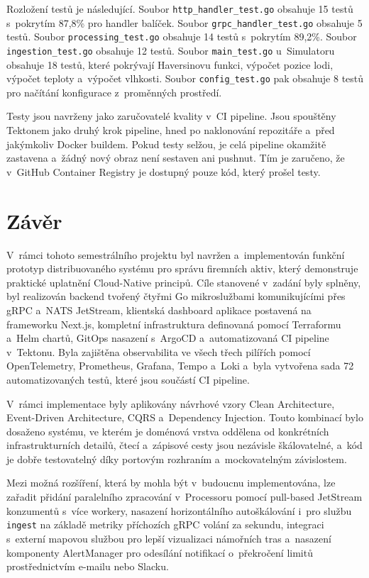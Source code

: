 \documentclass[11pt, a4paper, oneside]{article}
\begin{document}
Rozložení testů je následující. Soubor \texttt{http\_handler\_test.go} obsahuje 15 testů s~pokrytím 87,8\% pro handler balíček. Soubor \texttt{grpc\_handler\_test.go} obsahuje 5 testů. Soubor \texttt{processing\_test.go} obsahuje 14 testů s~pokrytím 89,2\%. Soubor \texttt{ingestion\_test.go} obsahuje 12 testů. Soubor \texttt{main\_test.go} u~Simulatoru obsahuje 18 testů, které pokrývají Haversinovu funkci, výpočet pozice lodi, výpočet teploty a~výpočet vlhkosti. Soubor \texttt{config\_test.go} pak obsahuje 8 testů pro načítání konfigurace z~proměnných prostředí.

Testy jsou navrženy jako zaručovatelé kvality v~CI pipeline. Jsou spouštěny Tektonem jako druhý krok pipeline, hned po naklonování repozitáře a~před jakýmkoliv Docker buildem. Pokud testy selžou, je celá pipeline okamžitě zastavena a~žádný nový obraz není sestaven ani pushnut. Tím je zaručeno, že v~GitHub Container Registry je dostupný pouze kód, který prošel testy.

\section{Závěr}

V~rámci tohoto semestrálního projektu byl navržen a~implementován funkční prototyp distribuovaného systému pro správu firemních aktiv, který demonstruje praktické uplatnění Cloud-Native principů. Cíle stanovené v~zadání byly splněny, byl realizován backend tvořený čtyřmi Go mikroslužbami komunikujícími přes gRPC a~NATS JetStream, klientská dashboard aplikace postavená na frameworku Next.js, kompletní infrastruktura definovaná pomocí Terraformu a~Helm chartů, GitOps nasazení s~ArgoCD a~automatizovaná CI pipeline v~Tektonu. Byla zajištěna observabilita ve všech třech pilířích pomocí OpenTelemetry, Prometheus, Grafana, Tempo a~Loki a~byla vytvořena sada 72 automatizovaných testů, které jsou součástí CI pipeline.

V~rámci implementace byly aplikovány návrhové vzory Clean Architecture, Event-Driven Architecture, CQRS a~Dependency Injection. Touto kombinací bylo dosaženo systému, ve kterém je doménová vrstva oddělena od konkrétních infrastrukturních detailů, čtecí a~zápisové cesty jsou nezávisle škálovatelné, a~kód je dobře testovatelný díky portovým rozhraním a~mockovatelným závislostem.

Mezi možná rozšíření, která by mohla být v~budoucnu implementována, lze zařadit přidání paralelního zpracování v~Processoru pomocí pull-based JetStream konzumentů s~více workery, nasazení horizontálního autoškálování i~pro službu \texttt{ingest} na základě metriky příchozích gRPC volání za sekundu, integraci s~externí mapovou službou pro lepší vizualizaci námořních tras a~nasazení komponenty AlertManager pro odesílání notifikací o~překročení limitů prostřednictvím e-mailu nebo Slacku.
\end{document}
